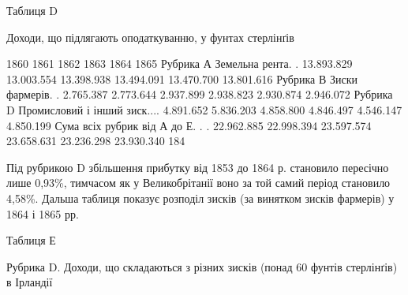 Таблиця D

Доходи, що підлягають оподаткуванню, у фунтах стерлінґів

                                              1860    1861    1862    1863    1864    1865
Рубрика А
Земельна рента. .    13.893.829    13.003.554    13.398.938    13.494.091    13.470.700   
13.801.616
Рубрика В
Зиски фармерів. .    2.765.387    2.773.644    2.937.899    2.938.823    2.930.874    2.946.072
Рубрика D
Промисловий і інший
зиск....    4.891.652    5.836.203    4.858.800    4.846.497    4.546.147    4.850.199
Сума всіх рубрик
від А до Е. . .    22.962.885    22.998.394    23.597.574    23.658.631    23.236.298     23.930.340
184

Під рубрикою D збільшення прибутку від 1853 до 1864 р.
становило пересічно лише 0,93\%, тимчасом як у Великобрітанії
воно за той самий період становило 4,58\%. Дальша таблиця показує
розподіл зисків (за винятком зисків фармерів) у 1864 і
1865 рр.

Таблиця Е

Рубрика D. Доходи, що складаються з різних зисків (понад 60 фунтів
стерлінґів) в Ірландії

